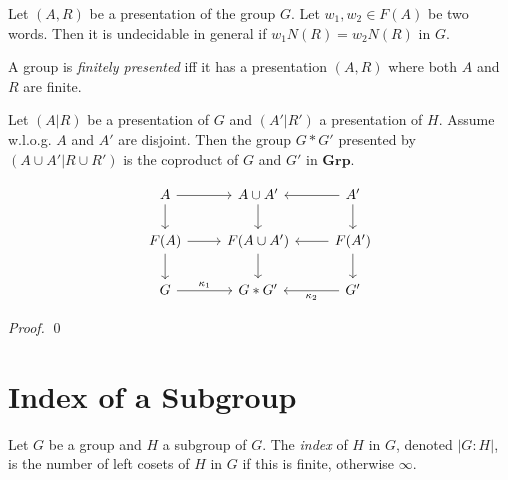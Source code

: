 \begin{prop}
Let $(A,R)$ be a presentation of the group $G$. Let $w_1, w_2 \in F(A)$ be two words. Then it is undecidable in general if $w_1N(R) = w_2N(R)$ in $G$.
\end{prop}

\begin{df}
A group is \emph{finitely presented} iff it has a presentation $(A,R)$ where both $A$ and $R$ are finite.
\end{df}

\begin{prop}
Let $(A|R)$ be a presentation of $G$ and $(A'|R')$ a presentation of $H$. Assume w.l.o.g. $A$ and $A'$ are disjoint. Then the group $G * G'$ presented by $(A \cup A' | R \cup R')$ is the coproduct of $G$ and $G'$ in $\mathbf{Grp}$.
\end{prop}

\[ \begin{tikzcd}
A \arrow[d] \arrow[r] & A \cup A' \arrow[d] & A' \arrow[l] \arrow[d] \\
 F(A) \arrow[d] \arrow[r] & F(A \cup A') \arrow[d] & F(A') \arrow[l] \arrow[d] \\
G \arrow[r, "\kappa_1"] & G * G' & G' \arrow[l, "\kappa_2"]
\end{tikzcd} \]

\begin{proof}
\pf
{}
\qed
\end{proof}

\section{Index of a Subgroup}

\begin{df}[Index]
Let $G$ be a group and $H$ a subgroup of $G$. The \emph{index} of $H$ in $G$, denoted $|G:H|$, is the number of left cosets of $H$ in $G$ if this is finite, otherwise $\infty$.
\end{df}

